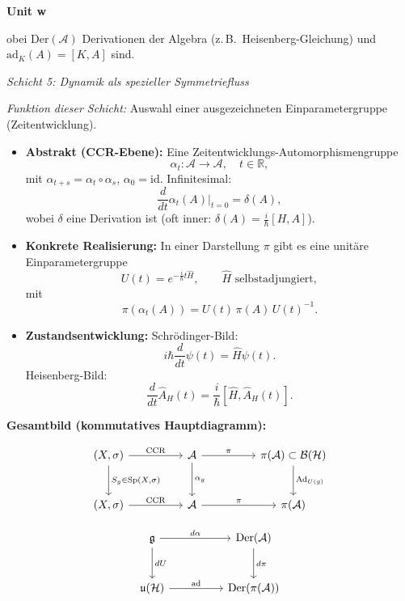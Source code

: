 \documentclass[10pt, letterpaper]{article}
\newcommand{\R}{\mathbb{R}}
\newenvironment{unit}[1]
  {\begin{unitbox}\textbf{Unit #1}\par\smallskip}
  {\end{unitbox}}
\begin{document}
\begin{unit}
wobei \(\mathrm{Der}(\mathcal{A})\) Derivationen der Algebra (z.\,B.\ Heisenberg-Gleichung)
und \(\mathrm{ad}_K(A)=[K,A]\) sind.

\emph{Schicht 5: Dynamik als spezieller Symmetriefluss}

\emph{Funktion dieser Schicht:}
Auswahl einer ausgezeichneten Einparametergruppe (Zeitentwicklung).

\begin{itemize}
  \item \textbf{Abstrakt (CCR-Ebene):}
        Eine Zeitentwicklungs-Automorphismengruppe
        \[
        \alpha_t:\mathcal{A}\to\mathcal{A},\quad t\in\R,
        \]
        mit \(\alpha_{t+s}=\alpha_t\circ\alpha_s\), \(\alpha_0=\mathrm{id}\).
        Infinitesimal:
        \[
        \frac{d}{dt}\alpha_t(A)\big|_{t=0} = \delta(A),
        \]
        wobei \(\delta\) eine Derivation ist (oft inner: \(\delta(A)=\frac{i}{\hbar}[H,A]\)).

  \item \textbf{Konkrete Realisierung:}
        In einer Darstellung \(\pi\) gibt es eine unitäre Einparametergruppe
        \[
        U(t)=e^{-\frac{i}{\hbar}t\hat H},\qquad \hat H \text{ selbstadjungiert},
        \]
        mit
        \[
        \pi(\alpha_t(A)) = U(t)\,\pi(A)\,U(t)^{-1}.
        \]

  \item \textbf{Zustandsentwicklung:}
        Schrödinger-Bild:
        \[
        i\hbar\frac{d}{dt}\psi(t) = \hat H \psi(t).
        \]
        Heisenberg-Bild:
        \[
        \frac{d}{dt}\hat A_H(t) = \frac{i}{\hbar}[\hat H,\hat A_H(t)].
        \]
\end{itemize}

\medskip

\noindent
\textbf{Gesamtbild (kommutatives Hauptdiagramm):}

\[
\begin{tikzcd}[column sep=huge,row sep=large]
(X,\sigma) \arrow{r}{\mathrm{CCR}} \arrow{d}{S_g\in\mathrm{Sp}(X,\sigma)}
& \mathcal{A} \arrow{r}{\pi} \arrow{d}{\alpha_g}
& \pi(\mathcal{A})\subset\mathcal{B}(\mathcal{H}) \arrow{d}{\mathrm{Ad}_{U(g)}}
\\
(X,\sigma) \arrow{r}{\mathrm{CCR}}
& \mathcal{A} \arrow{r}{\pi}
& \pi(\mathcal{A})
\end{tikzcd}
\]

\[
\begin{tikzcd}[column sep=huge,row sep=large]
\mathfrak g \arrow{r}{d\alpha} \arrow{d}{dU}
& \mathrm{Der}(\mathcal{A}) \arrow{d}{d\pi}
\\
\mathfrak u(\mathcal{H}) \arrow{r}{\mathrm{ad}}
& \mathrm{Der}(\pi(\mathcal{A}))
\end{tikzcd}
\]


\end{unit}
\end{document}
